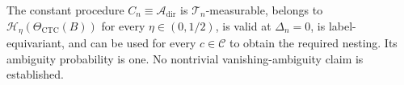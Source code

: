 The constant procedure \(C_n\equiv\mathcal A_{\mathrm{dir}}\) is \(\mathcal T_n\)-measurable, belongs to \(\mathcal H_\eta(\Theta_{\mathrm{CTC}}(B))\) for every \(\eta\in(0,1/2)\), is valid at \(\Delta_n=0\), is label-equivariant, and can be used for every \(c\in\mathcal C\) to obtain the required nesting.  Its ambiguity probability is one.  No nontrivial vanishing-ambiguity claim is established.